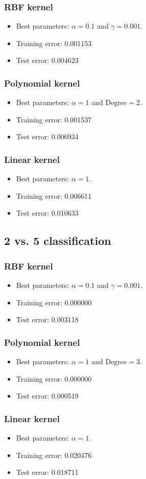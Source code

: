 \documentclass[12pt,a4paper]{article}
\theoremstyle{definition}
\theoremstyle{remark}
\begin{document}
\subsubsection{RBF kernel}
\begin{itemize}
    \item Best parameters: $\alpha = 0.1$ and $\gamma = 0.001$. 
    \item Training error: 0.001153
    \item Test error: 0.004623
\end{itemize}

\subsubsection{Polynomial kernel}
\begin{itemize}
    \item Best parameters: $\alpha = 1$ and $\text{Degree} = 2$. 
    \item Training error: 0.001537
    \item Test error: 0.006934
\end{itemize}

\subsubsection{Linear kernel}
\begin{itemize}
    \item Best parameters: $\alpha = 1$. 
    \item Training error: 0.006611
    \item Test error: 0.010633
\end{itemize}

\subsection{2 vs. 5 classification}
\subsubsection{RBF kernel}
\begin{itemize}
    \item Best parameters: $\alpha = 0.1$ and $\gamma = 0.001$. 
    \item Training error: 0.000000
    \item Test error: 0.003118
\end{itemize}

\subsubsection{Polynomial kernel}
\begin{itemize}
    \item Best parameters: $\alpha = 1$ and $\text{Degree} = 3$. 
    \item Training error: 0.000000
    \item Test error: 0.000519
\end{itemize}

\subsubsection{Linear kernel}
\begin{itemize}
    \item Best parameters: $\alpha = 1$. 
    \item Training error: 0.020476
    \item Test error: 0.018711
\end{itemize}
\end{document}
